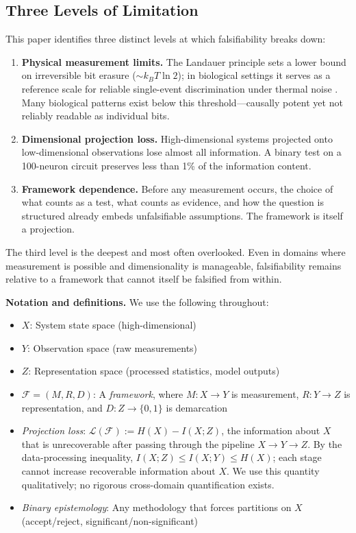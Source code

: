 \documentclass[12pt]{article}
\begin{document}
\subsection{Three Levels of Limitation}

This paper identifies three distinct levels at which falsifiability breaks down:

\begin{enumerate}
\item \textbf{Physical measurement limits.} The Landauer principle sets a lower bound on irreversible bit erasure ($\sim k_B T \ln 2$); in biological settings it serves as a reference scale for reliable single-event discrimination under thermal noise \cite{landauer1961}. Many biological patterns exist below this threshold---causally potent yet not reliably readable as individual bits.

\item \textbf{Dimensional projection loss.} High-dimensional systems projected onto low-dimensional observations lose almost all information. A binary test on a 100-neuron circuit preserves less than 1\% of the information content.

\item \textbf{Framework dependence.} Before any measurement occurs, the choice of what counts as a test, what counts as evidence, and how the question is structured already embeds unfalsifiable assumptions. The framework is itself a projection.
\end{enumerate}

The third level is the deepest and most often overlooked. Even in domains where measurement is possible and dimensionality is manageable, falsifiability remains relative to a framework that cannot itself be falsified from within.

\textbf{Notation and definitions.} We use the following throughout:
\begin{itemize}
\item $X$: System state space (high-dimensional)
\item $Y$: Observation space (raw measurements)
\item $Z$: Representation space (processed statistics, model outputs)
\item $\mathcal{F} = (M, R, D)$: A \emph{framework}, where $M: X \to Y$ is measurement, $R: Y \to Z$ is representation, and $D: Z \to \{0,1\}$ is demarcation
\item \emph{Projection loss}: $\mathcal{L}(\mathcal{F}) := H(X) - I(X;Z)$, the information about $X$ that is unrecoverable after passing through the pipeline $X \to Y \to Z$. By the data-processing inequality, $I(X;Z) \leq I(X;Y) \leq H(X)$; each stage cannot increase recoverable information about $X$. We use this quantity qualitatively; no rigorous cross-domain quantification exists.
\item \emph{Binary epistemology}: Any methodology that forces partitions on $X$ (accept/reject, significant/non-significant)
\end{itemize}
\end{document}
